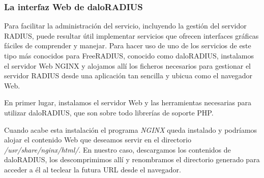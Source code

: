 \subsubsection{La interfaz Web de daloRADIUS} \label{daloRADIUSInstall}

Para facilitar la administración del servicio, incluyendo la gestión del servidor RADIUS, puede resultar útil implementar servicios que ofrecen interfaces gráficas fáciles de comprender y manejar. Para hacer uso de uno de los servicios de este tipo más conocidos para FreeRADIUS, conocido como daloRADIUS, instalamos el servidor Web NGINX y alojamos allí los ficheros necesarios para gestionar el servidor RADIUS desde una aplicación tan sencilla y ubicua como el navegador Web.

En primer lugar, instalamos el servidor Web y las herramientas necesarias para utilizar daloRADIUS, que son sobre todo librerías de soporte PHP.


Cuando acabe esta instalación el programa \emph{NGINX} queda instalado y podríamos alojar el contenido Web que deseamos servir en el directorio \emph{/usr/share/nginx/html/}. En nuestro caso, descargamos los contenidos de daloRADIUS, los descomprimimos allí y renombramos el directorio generado para acceder a él al teclear la futura URL desde el navegador.


